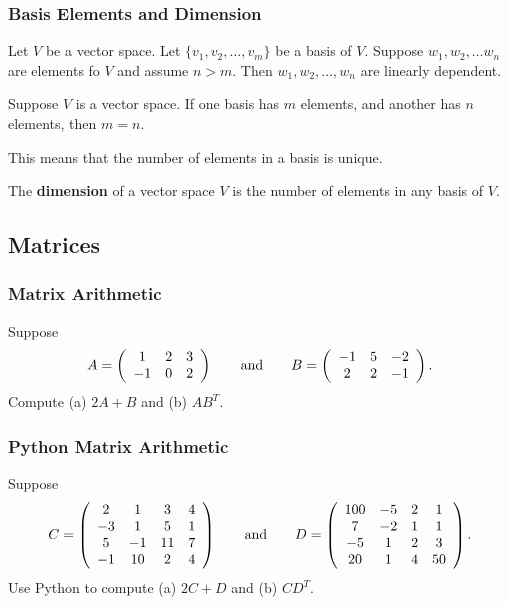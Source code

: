 \documentclass{beamer}
\begin{document}
\begin{frame}
\frametitle{Basis Elements and Dimension}
\begin{Theorem}
Let $V$ be a vector space. Let $\{v_1, v_2,\ldots, v_m\}$ be a basis of $V$. Suppose $w_1, w_2, \ldots w_n$ are elements fo $V$ and assume $n > m$. Then $w_1, w_2,\ldots, w_n$ are linearly dependent.
\end{Theorem}
\begin{Theorem}
Suppose $V$ is a vector space. If one basis has $m$ elements, and another has $n$ elements, then $m = n$.
\end{Theorem}
This means that the number of elements in a basis is unique. 
\begin{Definition}
The {\bf dimension} of a vector space $V$ is the number of elements in any basis of $V$.
\end{Definition}
\end{frame}

\subsection{Matrices} 

\begin{frame}[t]
\frametitle{Matrix Arithmetic}
\begin{Example}
Suppose 
$$
A = \left(\begin{array}{c c c} 1	&	2	&	3\\	-1	&	0	&	2\end{array}\right)\qquad\text{and}\qquad B = \left(\begin{array}{c c c} -1	&	5	&	-2\\	2	&	2	&	-1\end{array}\right).
$$
Compute (a) $2 A + B$ and (b) $A B^T$.
\end{Example}

\end{frame}

\begin{frame}
\frametitle{Python Matrix Arithmetic}
\begin{Example}
Suppose
$$
C = \left(\begin{array}{c c c c} 2		& 	1	&	3	&	4\\	-3	&	1	&	5	&	1\\	5	&	-1	&	11	&	7\\	-1	&	10	&	2	&4 \end{array}\right)
\qquad\text{and}\qquad
D =  \left(\begin{array}{c c c c} 100	& 	-5	&	2	&	1\\	7	&	-2	&	1	&	1\\	-5	&	1	&	2	&	3\\	20	&	1	&	4	&	50 \end{array}\right).
$$
Use Python to compute (a) $2C + D$ and (b) $C D^T$.
\end{Example}

\end{frame}
\end{document}

